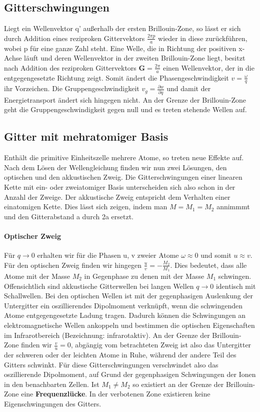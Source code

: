 \documentclass[11pt]{article}
\begin{document}
\subsection{Gitterschwingungen}
Liegt ein Wellenvektor q' außerhalb der ersten Brillouin-Zone, so lässt er sich
durch Addition eines reziproken Gittervektors $\frac{2\pi p}{a}$ wieder in diese
zurückführen, wobei p für eine ganze Zahl steht. Eine Welle, die in Richtung der
positiven x-Achse läuft und deren Wellenvektor in der zweiten Brillouin-Zone
liegt, besitzt nach Addition des reziproken Gittervektors $\bm{G}=\frac{2\pi}
{a}$ einen Wellenvektor, der in die entgegengesetzte Richtung zeigt. Somit
ändert die Phasengeschwindigkeit $v=\frac{\omega}{q}$ ihr Vorzeichen. Die
Gruppengeschwindigkeit $v_g=\frac{\partial w}{\partial q}$ und damit der
Energietransport ändert sich hingegen nicht. An der Grenze der Brillouin-Zone
geht die Gruppengeschwindigkeit gegen null und es treten stehende Wellen auf.
\subsection{Gitter mit mehratomiger Basis}
Enthält die primitive Einheitszelle mehrere Atome, so treten neue Effekte auf.
Nach dem Lösen der Wellengleichung finden wir nun zwei Lösungen, den optischen
und den akkustischen Zweig. Die Gitterschwingungen einer linearen Kette mit
ein- oder zweiatomiger Basis unterscheiden sich also schon in der Anzahl der
Zweige. Der akkustische Zweig entspricht dem Verhalten einer einatomigen Kette.
Dies lässt sich zeigen, indem man $M=M_1=M_2$ annimmmt und den Gitterabstand
a durch 2a ersetzt.
\noindent \paragraph{Optischer Zweig} Für $q\to 0$ erhalten wir für die Phasen
u, v zweier Atome $\omega \approx 0$ und somit $u \approx v$. Für den optischen
Zweig finden wir hingegen $\frac{u}{v}=-\frac{M_2}{M_1}$. Dies bedeutet, dass
alle Atome mit der Masse $M_2$ in Gegenphase zu denen mit der Masse $M_1$
schwingen. Offensichtlich sind akkustische Gitterwellen bei langen Wellen $
q\to 0$ identisch mit Schallwellen. Bei den optischen Wellen ist mit der
gegenphasigen Auslenkung der Untergitter ein oszillierendes Dipolmoment
verknüpft, wenn die schwingenden Atome entgegengesetzte Ladung tragen. Dadurch
können die Schwingungen an elektromagnetische Wellen ankoppeln und bestimmen
die optischen Eigenschaften im Infrarotbereich (Bezeichnung: infrarotaktiv).
An der Grenze der Brillouin-Zone finden wir $\frac{v}{u}=0$, abgängig vom
betrachteten Zweig ist also das Untergitter der schweren oder der leichten
Atome in Ruhe, während der andere Teil des Gitters schwinkt. Für diese
Gitterschwingungen verschwindet also das oszillierende Dipolmoment, auf Grund
der gegenphasigen Schwingungen der Ionen in den benachbarten Zellen. Ist $M_1
\neq M_2$ so existiert an der Grenze der Brillouin-Zone eine \textbf{
Frequenzlücke}. In der verbotenen Zone existieren keine Eigenschwingungen des
Gitters.
\end{document}
